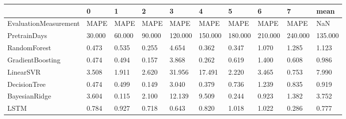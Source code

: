 \begin{tabular}{llllllllll}
\toprule
{} &      0 &      1 &      2 &       3 &       4 &       5 &       6 &       7 &    mean \\
\midrule
EvaluationMeasurement &   MAPE &   MAPE &   MAPE &    MAPE &    MAPE &    MAPE &    MAPE &    MAPE &     NaN \\
PretrainDays          & 30.000 & 60.000 & 90.000 & 120.000 & 150.000 & 180.000 & 210.000 & 240.000 & 135.000 \\
RandomForest          &  0.473 &  0.535 &  0.255 &   4.654 &   0.362 &   0.347 &   1.070 &   1.285 &   1.123 \\
GradientBoosting      &  0.474 &  0.494 &  0.157 &   3.868 &   0.262 &   0.619 &   1.400 &   0.608 &   0.986 \\
LinearSVR             &  3.508 &  1.911 &  2.620 &  31.956 &  17.491 &   2.220 &   3.465 &   0.753 &   7.990 \\
DecisionTree          &  0.474 &  0.499 &  0.149 &   3.040 &   0.379 &   0.736 &   1.239 &   0.835 &   0.919 \\
BayesianRidge         &  3.604 &  0.115 &  2.100 &  12.139 &   9.509 &   0.244 &   0.923 &   1.382 &   3.752 \\
LSTM                  &  0.784 &  0.927 &  0.718 &   0.643 &   0.820 &   1.018 &   1.022 &   0.286 &   0.777 \\
\bottomrule
\end{tabular}
